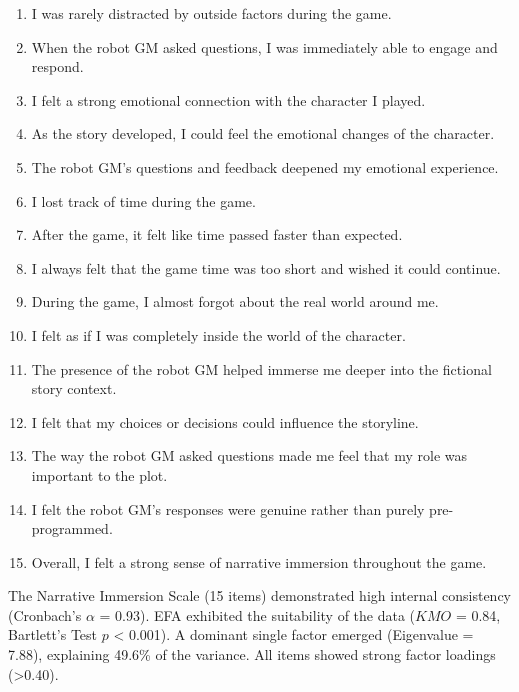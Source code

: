 \documentclass[sigconf,screen]{acmart-tagged}
\newcommand{\rev}[1]{#1}
\begin{document}
\begin{enumerate}
    \item I was rarely distracted by outside factors during the game.
    \item When the robot GM asked questions, I was immediately able to engage and respond.
    \item I felt a strong emotional connection with the character I played.
    \item As the story developed, I could feel the emotional changes of the character.
    \item The robot GM’s questions and feedback deepened my emotional experience.
    \item I lost track of time during the game.
    \item After the game, it felt like time passed faster than expected.
    \item I always felt that the game time was too short and wished it could continue.
    \item During the game, I almost forgot about the real world around me.
    \item I felt as if I was completely inside the world of the character.
    \item The presence of the robot GM helped immerse me deeper into the fictional story context.
    \item I felt that my choices or decisions could influence the storyline.
    \item The way the robot GM asked questions made me feel that my role was important to the plot.
    \item I felt the robot GM’s responses were genuine rather than purely pre-programmed.
    \item Overall, I felt a strong sense of narrative immersion throughout the game.
\end{enumerate}

\rev{The Narrative Immersion Scale (15 items) demonstrated high internal consistency (Cronbach's $\alpha$ = 0.93). EFA exhibited the suitability of the data ($KMO$ = 0.84, Bartlett's Test $p$ < 0.001). A dominant single factor emerged (Eigenvalue = 7.88), explaining 49.6\% of the variance. All items showed strong factor loadings (>0.40).}
\end{document}
